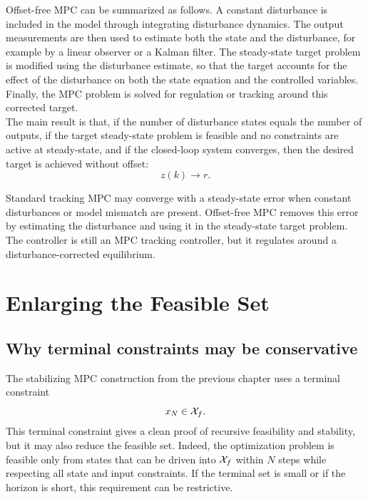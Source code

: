 Offset-free MPC can be summarized as follows. A constant disturbance is included in the model
through integrating disturbance dynamics. The output measurements are then used to estimate
both the state and the disturbance, for example by a linear observer or a Kalman filter. The
steady-state target problem is modified using the disturbance estimate, so that the target accounts
for the effect of the disturbance on both the state equation and the controlled variables. Finally,
the MPC problem is solved for regulation or tracking around this corrected target.\\
The main result is that, if the number of disturbance states equals the number of outputs, if the
target steady-state problem is feasible and no constraints are active at steady-state, and if the
closed-loop system converges, then the desired target is achieved without offset:
\[
    z(k)\to r.
\]

\begin{theorembox}
Standard tracking MPC may converge with a steady-state error when constant disturbances or
model mismatch are present. Offset-free MPC removes this error by estimating the disturbance
and using it in the steady-state target problem. The controller is still an MPC tracking controller,
but it regulates around a disturbance-corrected equilibrium.
\end{theorembox}

\section{Enlarging the Feasible Set}

\subsection{Why terminal constraints may be conservative}

The stabilizing MPC construction from the previous chapter uses a terminal constraint
\[
    x_N\in\mathcal{X}_f.
\]
This terminal constraint gives a clean proof of recursive feasibility and stability, but it may also
reduce the feasible set. Indeed, the optimization problem is feasible only from states that can be
driven into \(\mathcal{X}_f\) within \(N\) steps while respecting all state and input constraints. If the
terminal set is small or if the horizon is short, this requirement can be restrictive.\\

